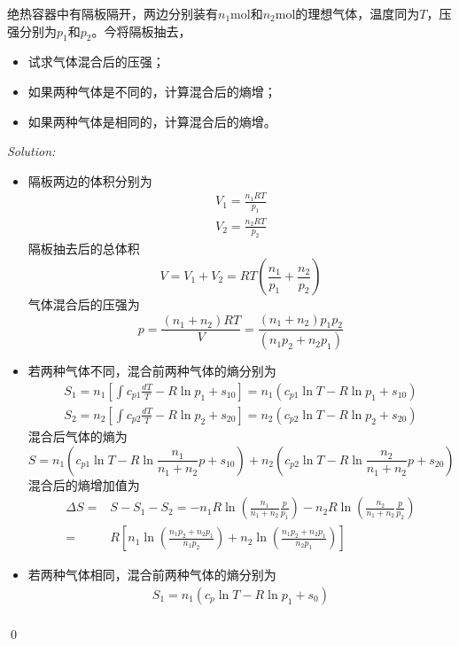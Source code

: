 \documentclass[12pt,a4paper]{article}
\newenvironment{problem}[2][Problem]{\begin{trivlist}
\item[\hskip \labelsep {\bfseries #1}\hskip \labelsep {\bfseries #2.}]}{\end{trivlist}}
\newenvironment{sol}
    {\emph{Solution:}
    }
    {
    \qed
    }
\begin{document}
\begin{problem}{4.8}
绝热容器中有隔板隔开，两边分别装有$n_1$mol和$n_2$mol的理想气体，温度同为$T$，压强分别为$p_1$和$p_2$。今将隔板抽去，
\begin{itemize}
\item[（a）] 试求气体混合后的压强；
\item[（b）] 如果两种气体是不同的，计算混合后的熵增；
\item[（c）] 如果两种气体是相同的，计算混合后的熵增。
\end{itemize}
\end{problem}
\begin{sol}
\begin{itemize}
\item[（a）] 隔板两边的体积分别为
\begin{gather}
V_1=\frac{n_1RT}{p_1}\\
V_2=\frac{n_2RT}{p_2}
\end{gather}
隔板抽去后的总体积
\begin{equation}
V=V_1+V_2=RT(\frac{n_1}{p_1}+\frac{n_2}{p_2})
\end{equation}
气体混合后的压强为
\begin{equation}
p=\frac{(n_1+n_2)RT}{V}=\frac{(n_1+n_2)p_1p_2}{(n_1p_2+n_2p_1)}
\end{equation}
\item[（b）] 若两种气体不同，混合前两种气体的熵分别为
\begin{gather}
S_1=n_1\left[\int c_{p1}\frac{dT}{T}-R\ln p_1+s_{10}\right]=n_1(c_{p1}\ln T-R\ln p_1+s_{10})\\
S_2=n_2\left[\int c_{p2}\frac{dT}{T}-R\ln p_2+s_{20}\right]=n_2(c_{p2}\ln T-R\ln p_2+s_{20})
\end{gather}
混合后气体的熵为
\begin{equation}
S=n_1(c_{p1}\ln T-R\ln\frac{n_1}{n_1+n_2}p+s_{10})+n_2(c_{p2}\ln T-R\ln\frac{n_2}{n_1+n_2}p+s_{20})
\end{equation}
混合后的熵增加值为
\begin{align}
\nonumber\Delta S=&S-S_1-S_2=-n_1R\ln\left(\frac{n_1}{n_1+n_2}\frac{p}{p_1}\right)-n_2R\ln\left(\frac{n_2}{n_1+n_2}\frac{p}{p_2}\right)\\
=&R\left[n_1\ln\left(\frac{n_1p_2+n_2p_1}{n_1p_2}\right)+n_2\ln\left(\frac{n_1p_2+n_2p_1}{n_2p_1}\right)\right]
\end{align}
\item[（c）] 若两种气体相同，混合前两种气体的熵分别为
\begin{gather}
S_1=n_1(c_p\ln T-R\ln p_1+s_0)\\

\end{gather}
\end{itemize}
\end{sol}
\end{document}
